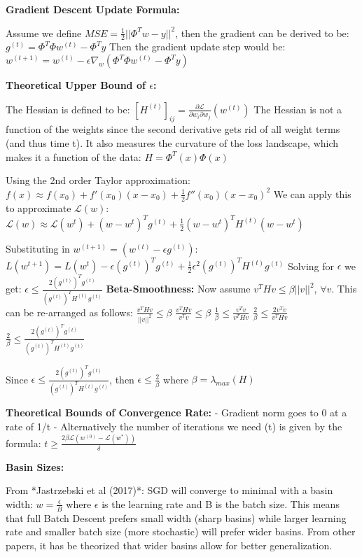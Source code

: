 \textbf{Gradient Descent Update Formula:} 

Assume we define $MSE = \frac{1}{2}||\Phi^{T}w - y||^2$, then the gradient can be derived to be: 
$g^{(t)} = \Phi^T\Phi w^{(t)} - \Phi^Ty$
Then the gradient update step would be: 
$w^{(t+1)} = w^{(t)} - \epsilon \nabla_{w}(\Phi^{T}\Phi w^{(t)} -\Phi^{T}y)$

\textbf{Theoretical Upper Bound of $\epsilon$:} 

The Hessian is defined to be: 
$\left[H^{(t)}\right]_{ij} = \frac{\partial \mathcal{L}}{\partial w_{i}\partial w_{j}}(w^{(t)})$
The Hessian is not a function of the weights since the second derivative gets rid of all weight terms (and thus time t). It also measures the curvature of the loss landscape, which makes it a function of the data: 
$H = \Phi^{T}(x)\Phi(x)$

Using the 2nd order Taylor approximation: 
$f(x) \approx f(x_0) + f'(x_0)(x-x_0) + \frac{1}{2}f''(x_0)(x-x_0)^2$
We can apply this to approximate $\mathcal{L}(w)$: 
$    \mathcal{L}(w) \approx \mathcal{L}(w^{t}) + (w-w^{t})^T g^{(t)} + \frac{1}{2} (w-w^{t})^T H^{(t)} (w-w^{t})$

Substituting in $w^{(t+1)} =  (w^{(t)} - \epsilon g^{(t)})$: 
${L}(w^{t+1}) = {L}(w^{t}) - \epsilon (g^{(t)})^T g^{(t)} + \frac{1}{2}\epsilon^2 (g^{(t)})^T H^{(t)} g^{(t)} $
Solving for $\epsilon$ we get: 
$    \epsilon \leq \frac{2 (g^{(t)})^T g^{(t)} }{(g^{(t)})^T H^{(t)} g^{(t)} }$
\textbf{Beta-Smoothness:}
Now assume $v^T H v \leq \beta ||v||^2$, $\forall v$. This can be re-arranged as follows: 
$    \frac{v^T H v}{||v||^2} \leq \beta$
$    \frac{v^T H v}{v^T v} \leq \beta $
$    \frac{1}{\beta} \leq \frac{v^T v}{v^T H v} $
$    \frac{2}{\beta} \leq \frac{2v^T v}{v^T H v}$
$    \frac{2}{\beta} \leq \frac{2 (g^{(t)})^T g^{(t)}}{(g^{(t)})^T H^{(t)} g^{(t)}}$

Since $\epsilon \leq \frac{2 (g^{(t)})^T g^{(t)} }{(g^{(t)})^T H^{(t)} g^{(t)} }$, then $\epsilon \leq \frac{2}{\beta}$ where $\beta = \lambda_{max}(H)$

\textbf{Theoretical Bounds of Convergence Rate:} 
- Gradient norm goes to 0 at a rate of 1/t
- Alternatively the number of iterations we need (t) is given by the formula: 
$t \geq \frac{2\beta \mathcal{L} (w^{(0)} - \mathcal{L}(w^{*})) }{\delta}$

\textbf{Basin Sizes:} 

From *Jastrzebski et al (2017)*: SGD will converge to minimal with a basin width:
$w = \frac{\epsilon}{B}$ where $\epsilon$ is the learning rate and B is the batch size. This means that full Batch Descent prefers small width (sharp basins) while larger learning rate and smaller batch size (more stochastic) will prefer wider basins. From other papers, it has be theorized that wider basins allow for better generalization.

